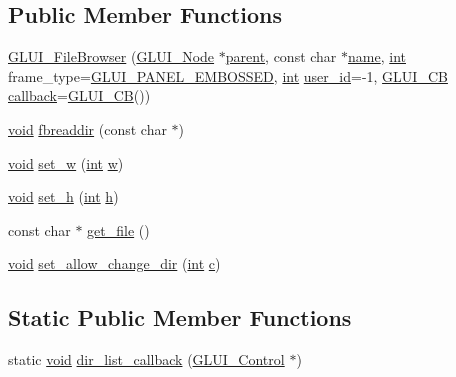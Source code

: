 \subsection*{Public Member Functions}
\begin{DoxyCompactItemize}
\item 
\hyperlink{class_g_l_u_i___file_browser_ace9c0db8913e7e5ecc72a859746e0d45}{G\+L\+U\+I\+\_\+\+File\+Browser} (\hyperlink{class_g_l_u_i___node}{G\+L\+U\+I\+\_\+\+Node} $\ast$\hyperlink{class_g_l_u_i___node_a8ed65d447784f6f88bd3e2e2bcac6cdb}{parent}, const char $\ast$\hyperlink{glext_8h_ad977737dfc9a274a62741b9500c49a32}{name}, \hyperlink{wglext_8h_a500a82aecba06f4550f6849b8099ca21}{int} frame\+\_\+type=\hyperlink{glui_8h_add54979a7b4391067b8a125ee34f690a}{G\+L\+U\+I\+\_\+\+P\+A\+N\+E\+L\+\_\+\+E\+M\+B\+O\+S\+S\+E\+D}, \hyperlink{wglext_8h_a500a82aecba06f4550f6849b8099ca21}{int} \hyperlink{class_g_l_u_i___control_a6c88b7c72b0800f88a5d4cda4868c8b6}{user\+\_\+id}=-\/1, \hyperlink{class_g_l_u_i___c_b}{G\+L\+U\+I\+\_\+\+C\+B} \hyperlink{class_g_l_u_i___control_a96060fe0cc6d537e736dd6eef78e24ab}{callback}=\hyperlink{class_g_l_u_i___c_b}{G\+L\+U\+I\+\_\+\+C\+B}())
\item 
\hyperlink{wglext_8h_a9e6b7f1933461ef318bb000d6bd13b83}{void} \hyperlink{class_g_l_u_i___file_browser_a76b3f6caf8832c0972d8b38c0f77e535}{fbreaddir} (const char $\ast$)
\item 
\hyperlink{wglext_8h_a9e6b7f1933461ef318bb000d6bd13b83}{void} \hyperlink{class_g_l_u_i___file_browser_a03e1e54808847b5e7461d27826cf7827}{set\+\_\+w} (\hyperlink{wglext_8h_a500a82aecba06f4550f6849b8099ca21}{int} \hyperlink{glext_8h_a713abae75276598501f75c68917c5e2d}{w})
\item 
\hyperlink{wglext_8h_a9e6b7f1933461ef318bb000d6bd13b83}{void} \hyperlink{class_g_l_u_i___file_browser_a41b68f6bf7e87c25236a6a7ae78ee98b}{set\+\_\+h} (\hyperlink{wglext_8h_a500a82aecba06f4550f6849b8099ca21}{int} \hyperlink{glext_8h_afa0fb1b5e976920c0abeff2dca3ed774}{h})
\item 
const char $\ast$ \hyperlink{class_g_l_u_i___file_browser_a671f6f7608f38f48d07f7739e1efcad3}{get\+\_\+file} ()
\item 
\hyperlink{wglext_8h_a9e6b7f1933461ef318bb000d6bd13b83}{void} \hyperlink{class_g_l_u_i___file_browser_a5395fc694e33fab6cd3a0546b6899292}{set\+\_\+allow\+\_\+change\+\_\+dir} (\hyperlink{wglext_8h_a500a82aecba06f4550f6849b8099ca21}{int} \hyperlink{glext_8h_a1f2d7f8147412c43ba2303a56f97ee73}{c})
\end{DoxyCompactItemize}
\subsection*{Static Public Member Functions}
\begin{DoxyCompactItemize}
\item 
static \hyperlink{wglext_8h_a9e6b7f1933461ef318bb000d6bd13b83}{void} \hyperlink{class_g_l_u_i___file_browser_a4b5349bd76f0de54a9ce90d8d946e678}{dir\+\_\+list\+\_\+callback} (\hyperlink{class_g_l_u_i___control}{G\+L\+U\+I\+\_\+\+Control} $\ast$)
\end{DoxyCompactItemize}
